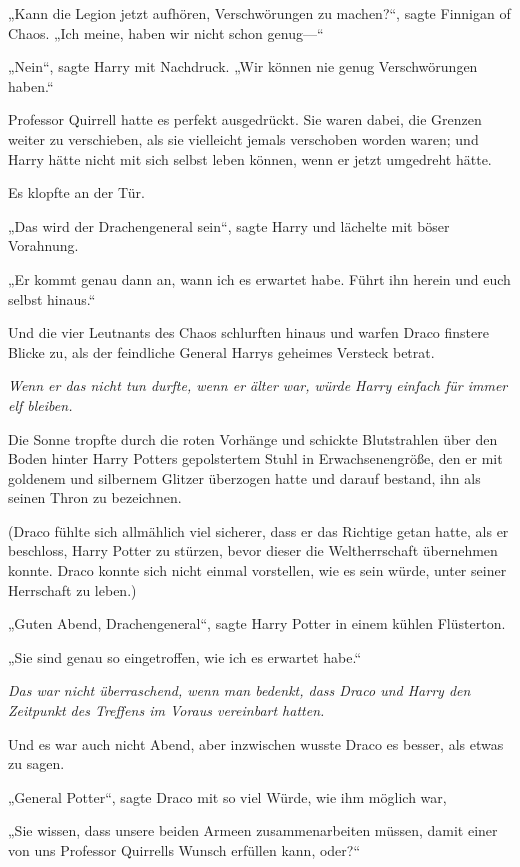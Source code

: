 {„Kann die Legion jetzt aufhören, Verschwörungen zu machen?“, sagte Finnigan of Chaos. „Ich meine, haben wir nicht schon genug—“

„Nein“, sagte Harry mit Nachdruck. „Wir können nie genug Verschwörungen haben.“

Professor Quirrell hatte es perfekt ausgedrückt. Sie waren dabei, die Grenzen weiter zu verschieben, als sie vielleicht jemals verschoben worden waren; und Harry hätte nicht mit sich selbst leben können, wenn er jetzt umgedreht hätte.

Es klopfte an der Tür.

„Das wird der Drachengeneral sein“, sagte Harry und lächelte mit böser Vorahnung.

„Er kommt genau dann an, wann ich es erwartet habe. Führt ihn herein und euch selbst hinaus.“

Und die vier Leutnants des Chaos schlurften hinaus und warfen Draco finstere Blicke zu, als der feindliche General Harrys geheimes Versteck betrat.

\emph{Wenn er das nicht tun durfte, wenn er älter war, würde Harry einfach für immer elf bleiben.}

Die Sonne tropfte durch die roten Vorhänge und schickte Blutstrahlen über den Boden hinter Harry Potters gepolstertem Stuhl in Erwachsenengröße, den er mit goldenem und silbernem Glitzer überzogen hatte und darauf bestand, ihn als seinen Thron zu bezeichnen.

(Draco fühlte sich allmählich viel sicherer, dass er das Richtige getan hatte, als er beschloss, Harry Potter zu stürzen, bevor dieser die Weltherrschaft übernehmen konnte. Draco konnte sich nicht einmal vorstellen, wie es sein würde, unter seiner Herrschaft zu leben.)

„Guten Abend, Drachengeneral“, sagte Harry Potter in einem kühlen Flüsterton.

„Sie sind genau so eingetroffen, wie ich es erwartet habe.“

\emph{Das war nicht überraschend, wenn man bedenkt, dass Draco und Harry den Zeitpunkt des Treffens im Voraus vereinbart hatten.}

Und es war auch nicht Abend, aber inzwischen wusste Draco es besser, als etwas zu sagen.

„General Potter“, sagte Draco mit so viel Würde, wie ihm möglich war,

„Sie wissen, dass unsere beiden Armeen zusammenarbeiten müssen, damit einer von uns Professor Quirrells Wunsch erfüllen kann, oder?“

}
